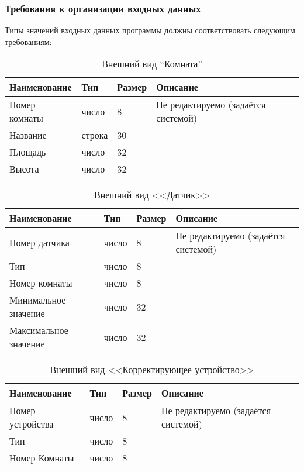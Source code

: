     \subsubsection{Требования к организации входных данных}
      Типы значений входных данных программы должны соответствовать следующим требованиям:
          \begin{table}[h!]
            \centering
            \caption{Внешний вид “Комната”}
            \label{room:size}
            \begin{tabular}{|l|l|l|l|}
            \hline
            Наименование & Тип & Размер & Описание \\ \hline
            Номер комнаты & число & 8 & Не редактируемо (задаётся системой) \\ \hline
            Название  & строка & 30 & \\ \hline
            Площадь  & число & 32 &  \\ \hline
            Высота    & число & 32 & \\ \hline
            \end{tabular}
          \end{table}
          \begin{table}[h!]
            \centering
            \caption{Внешний вид <<Датчик>>}
            \label{sensor:size}
            \begin{tabular}{|l|l|l|l|}
            \hline
            Наименование & Тип & Размер & Описание \\ \hline
            Номер датчика & число & 8 & Не редактируемо (задаётся системой)\\ \hline
            Тип & число & 8 & \\ \hline
            Номер комнаты   & число & 8 & \\ \hline
            Минимальное значение & число & 32 & \\ \hline
            Максимальное значение & число & 32 & \\ \hline
            \end{tabular}
          \end{table}
          \begin{table}[h!]
            \centering
            \caption{Внешний вид <<Корректирующее устройство>>}
            \label{sensor:size}
            \begin{tabular}{|l|l|l|l|}
            \hline
            Наименование & Тип & Размер & Описание \\ \hline
            Номер устройства & число & 8 & Не редактируемо (задаётся системой) \\ \hline
            Тип & число & 8 & \\ \hline
            Номер Комнаты & число & 8 & \\ \hline
            \end{tabular}
          \end{table}
          
